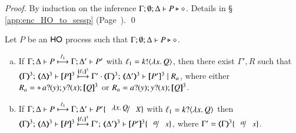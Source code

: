 \begin{proof}
By induction on the inference $\Gamma; \emptyset; \Delta \proves P \hastype \Proc$. 
Details in \S\,\ref{app:enc_HO_to_sessp} (Page~\pageref{app:enc_HO_to_sessp}).
	\qed
\end{proof}

\begin{proposition}
Let $P$ be an  $\HO$ process such that  $\Gamma; \emptyset; \Delta \proves P \hastype \Proc$.
		\begin{enumerate}[a)]
			\item	 
			   If  $\stytra{\Gamma}{\ell_1}{\Delta}{P}{\Delta'}{P'}$
			   with $\ell_1 = \bactout{k}{\abs{x}Q}$,
			   then 
			   there exist $\Gamma', R$ such that \\
			   $\mapt{\Gamma}^{3};\, \mapt{\Delta}^{3} \proves  \map{P}^{3} 
			   \hby{\mapa{\ell_1}^{3}}
			   \Gamma' \cdot \mapt{\Gamma}^{3};\, \mapt{\Delta'}^{3} \proves \map{P'}^{3} \Par R_a$, 
			   where either \\
			   $R_a = \repl{} \binp{a}{y} \binp{y}{x} \pmap{Q}{3}$ 
			   or $ R_a = \binp{a}{y} \binp{y}{x} \pmap{Q}{3}$.
			   


			\item	 
			   If  $\stytra{\Gamma}{\ell_1}{\Delta}{P}{\Delta'}{P'\subst{\abs{x}Q}{X}}$
			   with $\ell_1 = \bactinp{k}{\abs{x}Q}$
			   then \\
			   $\mapt{\Gamma}^{3};\, \mapt{\Delta}^{3} \proves  \map{P}^{3} 
			   \hby{\mapa{\ell_1}^{3}}
			   \Gamma';\, \mapt{\Delta'}^{3} \proves  \map{P'}^{3}\subst{a}{x}$, 
			   where $\Gamma' = \mapt{\Gamma}^{3}\subst{a}{x}$.
			   
			   




\end{enumerate}
\end{proposition}
